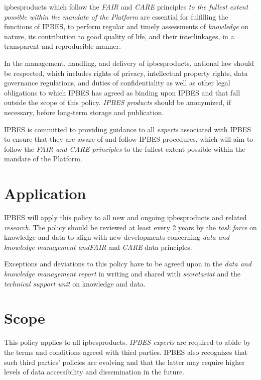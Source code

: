 \documentclass{article}
\begin{document}
\gls{ipbesproducts} which follow the \textit{FAIR }and\textit{ CARE }principles \textit{to the fullest extent possible within the mandate of the Platform} are essential for fulfilling the functions of IPBES, to perform regular and timely assessments of \textit{knowledge} on nature, its contribution to good quality of life, and their interlinkages, in a transparent and reproducible manner.

In the management, handling, and delivery of \gls{ipbesproducts}, national law should be respected, which includes rights of privacy, intellectual property rights, data governance regulations, and duties of confidentiality as well as other legal obligations to which IPBES has agreed as binding upon IPBES and that fall outside the scope of this policy. \textit{IPBES products }should be anonymized, if necessary, before long-term storage and publication.

IPBES is committed to providing guidance to all \textit{experts }associated with IPBES to ensure that they are aware of and follow IPBES procedures, which will aim to follow the \textit{FAIR and CARE principles} to the fullest extent possible within the mandate of the Platform.

\section{Application}

IPBES will apply this policy to all new and ongoing \gls{ipbesproducts} and related \textit{research}. The policy should be reviewed at least every 2 years by the \textit{task force }on knowledge and data to align with new developments concerning \textit{data and knowledge management and}\textit{FAIR }and\textit{ CARE }data principles.

Exceptions and deviations to this policy have to be agreed upon in the \textit{data and knowledge management report} in writing and shared with \textit{secretariat }and the \textit{technical support unit }on knowledge and data\textit{.}

\section{Scope}

This policy applies to all \gls{ipbesproducts}. \textit{IPBES experts }are required to abide by the terms and conditions agreed with third parties. IPBES also recognizes that such third parties’ policies are evolving and that the latter may require higher levels of data accessibility and dissemination in the future.
\end{document}

